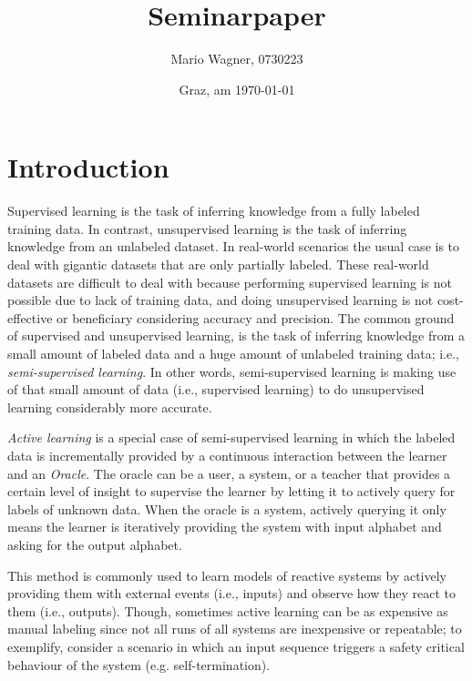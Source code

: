 \documentclass[
a4paper,
12pt
]{scrartcl}
\title{Seminarpaper}
\author{Mario Wagner, 0730223}
\date{Graz, am \today{}}
\begin{document}
 \maketitle
 \tableofcontents
 \listoffigures
 \listoftables

\newpage


\section{Introduction}
Supervised learning is the task of inferring knowledge from a fully labeled training data. In contrast, unsupervised learning is the task of inferring knowledge from an unlabeled dataset. In real-world scenarios the usual case is to deal with gigantic datasets that are only partially labeled. These real-world datasets are difficult to deal with because performing supervised learning is not possible due to lack of training data, and doing unsupervised learning is not cost-effective or beneficiary considering accuracy and precision. The common ground of supervised and unsupervised learning, is the task of inferring knowledge from a small amount of labeled data and a huge amount of unlabeled training data; i.e., \emph{semi-supervised learning}. In other words, semi-supervised learning is making use of that small amount of data (i.e., supervised learning) to do unsupervised learning considerably more accurate.
\par \emph{Active learning} is a special case of semi-supervised learning in which the labeled data is incrementally provided by a continuous interaction between the learner and an \emph{Oracle}. The oracle can be a user, a system, or a teacher that provides a certain level of insight to supervise the learner by letting it to actively query for labels of unknown data. When the oracle is a system, actively querying it only means the learner is iteratively providing the system with input alphabet and asking for the output alphabet.
\par This method is commonly used to learn models of reactive systems by actively providing them with external events (i.e., inputs) and observe how they react to them (i.e., outputs). Though, sometimes active learning can be as expensive as manual labeling since not all runs of all systems are inexpensive or repeatable; to exemplify, consider a scenario in which an input sequence triggers a safety critical behaviour of the system (e.g. self-termination).
\end{document}
